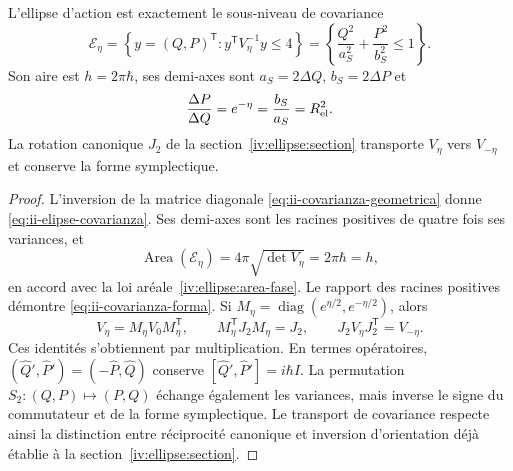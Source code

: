 \begin{proposition}
\label{prop:ii-area-covarianza-reciprocidad}
L'ellipse d'action est exactement le sous-niveau de covariance
\begin{equation}
 \mathcal E_\eta
 =\left\{y=(Q,P)^{\mathsf T}:y^{\mathsf T}V_\eta^{-1}y\leq4\right\}
 =\left\{\frac{Q^2}{a_S^2}+\frac{P^2}{b_S^2}\leq1\right\}.
 \label{eq:ii-elipse-covarianza}
\end{equation}
Son aire est \(h=2\pi\hbar\), ses demi-axes sont
\(a_S=2\Delta Q\), \(b_S=2\Delta P\) et
\begin{equation}
 \frac{\Delta P}{\Delta Q}=e^{-\eta}
 =\frac{b_S}{a_S}=R_{\rm el}^2.
 \label{eq:ii-covarianza-forma}
\end{equation}
La rotation canonique \(J_2\) de la section~\ref{iv:ellipse:section} transporte
\(V_\eta\) vers \(V_{-\eta}\) et conserve la forme symplectique.
\end{proposition}

\begin{proof}
L'inversion de la matrice diagonale
\eqref{eq:ii-covarianza-geometrica} donne
\eqref{eq:ii-elipse-covarianza}. Ses demi-axes sont les racines positives de
quatre fois ses variances, et
\[
 \operatorname{Area}(\mathcal E_\eta)
 =4\pi\sqrt{\det V_\eta}=2\pi\hbar=h,
\]
en accord avec la loi aréale~\eqref{iv:ellipse:area-fase}.
Le rapport des racines positives démontre
\eqref{eq:ii-covarianza-forma}.
Si \(M_\eta=\operatorname{diag}(e^{\eta/2},e^{-\eta/2})\), alors
\[
 V_\eta=M_\eta V_0M_\eta^{\mathsf T},\qquad
 M_\eta^{\mathsf T}J_2M_\eta=J_2,\qquad
 J_2V_\eta J_2^{\mathsf T}=V_{-\eta}.
\]
Ces identités s'obtiennent par multiplication. En termes opératoires,
\((\widehat Q',\widehat P')=(-\widehat P,\widehat Q)\) conserve
\([\widehat Q',\widehat P']=i\hbar I\). La permutation
\(S_2:(Q,P)\mapsto(P,Q)\) échange également les variances, mais inverse
le signe du commutateur et de la forme symplectique. Le transport de
covariance respecte ainsi la distinction entre réciprocité canonique et inversion
d'orientation déjà établie à la section~\ref{iv:ellipse:section}.
\end{proof}

